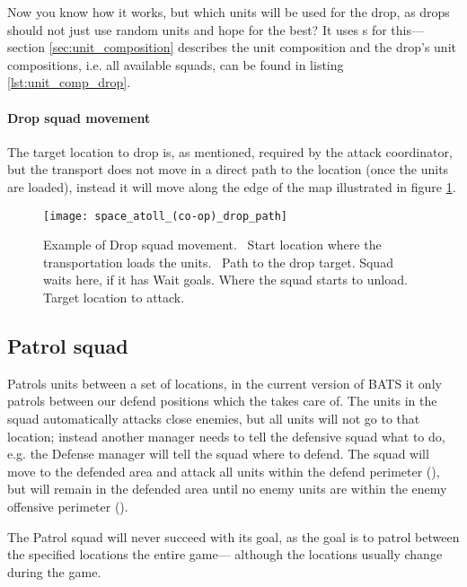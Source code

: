 Now you know how it works, but which units will be used for the drop, as drops should not just use
random units and hope for the best? It uses s for this—section
\ref{sec:unit_composition} describes the unit composition and the drop's unit compositions, i.e. all
available squads, can be found in listing \ref{lst:unit_comp_drop}. 



\paragraph{Drop squad movement}
The target location to drop is, as mentioned, required by the attack coordinator, but the transport does not move in a direct path to the location (once the units are loaded), instead it will move along the edge of the map illustrated in figure \ref{fig:drop_squad_movement}.
\begin{figure}[htb]
\centering
\texttt{[image: space\_atoll\_(co-op)\_drop\_path]}
\caption[Drop squad movement example]{Example of Drop squad movement.
\usebox{\LegendDotGreen}~Start location where the transportation loads the units.
\usebox{\LegendLineCyan}~Path to the drop target.
\usebox{\LegendDotOrange}Squad waits here, if it has Wait goals.
\usebox{\LegendDotYellow}Where the squad starts to unload.
\usebox{\LegendDotRed}Target location to attack.}
\label{fig:drop_squad_movement}
\end{figure}

\subsection{Patrol squad}
\label{sec:patrol_squad}
Patrols units between a set of locations, in the current version of BATS it only patrols between our defend positions which the  takes care of. The units in the squad automatically attacks close enemies, but all units will not go to that location; instead another manager needs to tell the defensive squad what to do, e.g. the Defense manager will tell the squad where to defend. The squad will move to the defended area and attack all units within the defend perimeter (\squadDefendDefendPerimeter), but will remain in the defended area until no enemy units are within the enemy offensive perimeter (\squadDefendEnemyOffensivePerimeter).

The Patrol squad will never succeed with its goal, as the goal is to patrol between the specified locations the entire game— although the locations usually change during the game.

